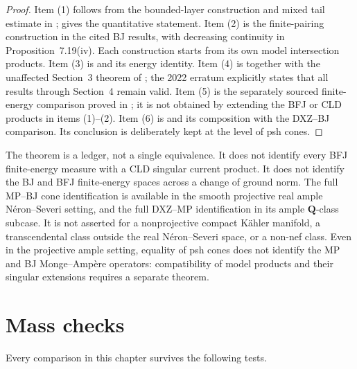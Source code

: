 \begin{proof}
Item (1) follows from the bounded-layer construction and mixed tail estimate in ;  gives the quantitative statement. Item (2) is the finite-pairing construction in the cited BJ results, with decreasing continuity in Proposition~7.19(iv). Each construction starts from its own model intersection products.
Item (3) is  and its energy identity.
Item (4) is  together with the unaffected
Section~3 theorem of \cite{BHJ19}; the 2022 erratum explicitly states that
all results through Section~4 remain valid.
Item (5) is the separately sourced finite-energy comparison proved in
; it is not obtained by extending
the BFJ or CLD products in items (1)--(2).
Item (6) is  and its composition with
the DXZ--BJ comparison.  Its conclusion is deliberately kept at the level
of psh cones.
\end{proof}

\begin{remark}
\label{rem:cma-no-universal-e1}
The theorem is a ledger, not a single equivalence.
It does not identify every BFJ finite-energy measure with a CLD singular
current product.
It does not identify the BJ and BFJ finite-energy spaces across a change of
ground norm.
The full MP--BJ cone identification is available in the smooth projective
real ample N\'eron--Severi setting, and the full DXZ--MP identification in
its ample $\mathbf Q$-class subcase.  It is not asserted for a
nonprojective compact K\"ahler manifold, a transcendental class outside
the real N\'eron--Severi space, or a non-nef class.  Even in the projective
ample setting, equality of psh cones does not identify the MP and BJ
Monge--Amp\`ere operators: compatibility of model products and their
singular extensions requires a separate theorem.
\end{remark}

\section{Mass checks}
\label{sec:cma-mass-checks}

Every comparison in this chapter survives the following tests.

